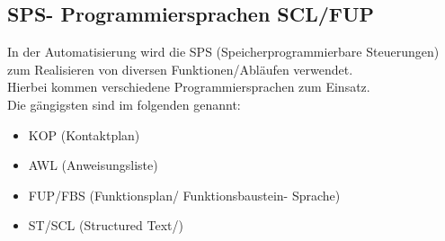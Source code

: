 \subsection{SPS- Programmiersprachen SCL/FUP}
In der Automatisierung wird die SPS (Speicherprogrammierbare Steuerungen) zum Realisieren von diversen Funktionen/Abläufen verwendet.\\
Hierbei kommen verschiedene Programmiersprachen zum Einsatz.\\
Die gängigsten \cite{} sind im folgenden genannt:
\begin{itemize}
	\item KOP (Kontaktplan)
	\item AWL (Anweisungsliste)
	\item FUP/FBS (Funktionsplan/ Funktionsbaustein- Sprache)
	\item ST/SCL (Structured Text/)
\end{itemize}